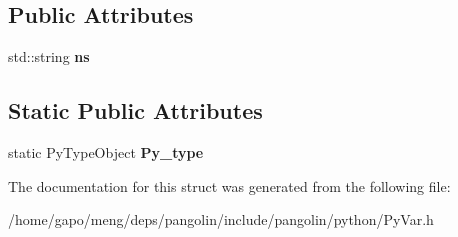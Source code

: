 \subsection*{Public Attributes}
\begin{DoxyCompactItemize}
\item 
std\+::string {\bfseries ns}\hypertarget{structpangolin_1_1_py_var_afe67c98bf7b61dab11a2c3950fe072e4}{}\label{structpangolin_1_1_py_var_afe67c98bf7b61dab11a2c3950fe072e4}

\end{DoxyCompactItemize}
\subsection*{Static Public Attributes}
\begin{DoxyCompactItemize}
\item 
static Py\+Type\+Object {\bfseries Py\+\_\+type}\hypertarget{structpangolin_1_1_py_var_a3b7bbb244a43b6304ee3b841ba2ae054}{}\label{structpangolin_1_1_py_var_a3b7bbb244a43b6304ee3b841ba2ae054}

\end{DoxyCompactItemize}


The documentation for this struct was generated from the following file\+:\begin{DoxyCompactItemize}
\item 
/home/gapo/meng/deps/pangolin/include/pangolin/python/Py\+Var.\+h\end{DoxyCompactItemize}

